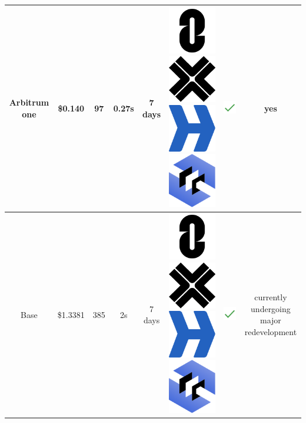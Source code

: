 \documentclass[fleqn,10pt]{olplainarticle}
\begin{document}
\begin{table}[H]
\begin{tabular}{|c|c|c|c|c|c|c|c|}
		Arbitrum one & \cellcolor[RGB]{255,100,0}\$0.140 & \cellcolor[RGB]{255,0,0}97 & \cellcolor[RGB]{0,255,0}0.27s & \cellcolor[RGB]{255,0,0}7 days\cite{arbitrum_frequently_2023} & \includegraphics[width=0.03\linewidth]{img/logoLayerZero} \includegraphics[width=0.03\linewidth]{img/logoAxelar} \includegraphics[width=0.03\linewidth]{img/logoHyperlane} \includegraphics[width=0.03\linewidth]{img/logoCCIP} & \includegraphics[width=0.03\linewidth]{img/check} & yes  \cite{arbitrum_fraud_2023} \\ \hline
		
		
		Base & \cellcolor[RGB]{255,50,0}\$1.3381 & \cellcolor[RGB]{255,200,0}385 & \cellcolor[RGB]{130,255,10}2s  & \cellcolor[RGB]{255,0,0}7 days\cite{optimism_understanding_nodate} & \includegraphics[width=0.03\linewidth]{img/logoLayerZero} \includegraphics[width=0.03\linewidth]{img/logoAxelar} \includegraphics[width=0.03\linewidth]{img/logoHyperlane} \includegraphics[width=0.03\linewidth]{img/logoCCIP} & \includegraphics[width=0.03\linewidth]{img/check} & \makecell{currently undergoing \\ major redevelopment\cite{optimism_fault_nodate}} \\  \hline
		

\end{tabular}
\end{table}
\end{document}

